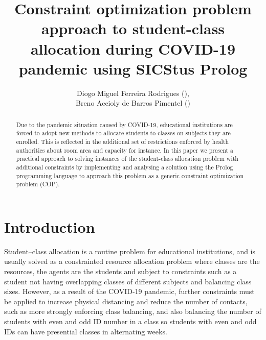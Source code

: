 \documentclass[runningheads]{llncs}
\begin{document}
\renewcommand{\arraystretch}{1.1}
\setlength\tabcolsep{5pt}

\title{Constraint optimization problem approach to student-class allocation during COVID-19 pandemic using SICStus Prolog}
%
%
\author{
Diogo Miguel Ferreira Rodrigues (),\\
Breno Accioly de Barros Pimentel ()
}


%
\maketitle              %
%
\begin{abstract}
Due to the pandemic situation caused by COVID-19, educational institutions are forced to adopt new methods to allocate students to classes on subjects they are enrolled. This is reflected in the additional set of restrictions enforced by health authorities about room area and capacity for instance. In this paper we present a practical approach to solving instances of the student-class allocation problem with additional constraints by implementing and analysing a solution using the Prolog programming language to approach this problem as a generic constraint optimization problem (COP).

\end{abstract}

\section{Introduction}

Student--class allocation is a routine problem for educational institutions, and is usually solved as a constrainted resource allocation problem where classes are the resources, the agents are the students and subject to constraints such as a student not having overlapping classes of different subjects and balancing class sizes.
However, as a result of the COVID-19 pandemic, further constraints must be applied to increase physical distancing and reduce the number of contacts, such as more strongly enforcing class balancing, and also balancing the number of students with even and odd ID number in a class so students with even and odd IDs can have presential classes in alternating weeks.
\end{document}

